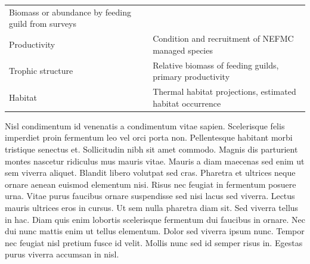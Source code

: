 \documentclass[11pt,]{article}
\begin{document}
\begin{longtable}[]{@{}ll@{}}
\begin{minipage}[t]{0.65\columnwidth}
Biomass or abundance by feeding guild from surveys\strut
\end{minipage}\tabularnewline
\begin{minipage}[t]{0.29\columnwidth}\raggedright\strut
Productivity\strut
\end{minipage} & \begin{minipage}[t]{0.65\columnwidth}\raggedright\strut
Condition and recruitment of NEFMC managed species\strut
\end{minipage}\tabularnewline
\begin{minipage}[t]{0.29\columnwidth}\raggedright\strut
Trophic structure\strut
\end{minipage} & \begin{minipage}[t]{0.65\columnwidth}\raggedright\strut
Relative biomass of feeding guilds, primary productivity\strut
\end{minipage}\tabularnewline
\begin{minipage}[t]{0.29\columnwidth}\raggedright\strut
Habitat\strut
\end{minipage} & \begin{minipage}[t]{0.65\columnwidth}\raggedright\strut
Thermal habitat projections, estimated habitat occurrence\strut
\end{minipage}\tabularnewline
\bottomrule
\end{longtable}

Nisl condimentum id venenatis a condimentum vitae sapien. Scelerisque
felis imperdiet proin fermentum leo vel orci porta non. Pellentesque
habitant morbi tristique senectus et. Sollicitudin nibh sit amet
commodo. Magnis dis parturient montes nascetur ridiculus mus mauris
vitae. Mauris a diam maecenas sed enim ut sem viverra aliquet. Blandit
libero volutpat sed cras. Pharetra et ultrices neque ornare aenean
euismod elementum nisi. Risus nec feugiat in fermentum posuere urna.
Vitae purus faucibus ornare suspendisse sed nisi lacus sed viverra.
Lectus mauris ultrices eros in cursus. Ut sem nulla pharetra diam sit.
Sed viverra tellus in hac. Diam quis enim lobortis scelerisque fermentum
dui faucibus in ornare. Nec dui nunc mattis enim ut tellus elementum.
Dolor sed viverra ipsum nunc. Tempor nec feugiat nisl pretium fusce id
velit. Mollis nunc sed id semper risus in. Egestas purus viverra
accumsan in nisl.
\end{document}
